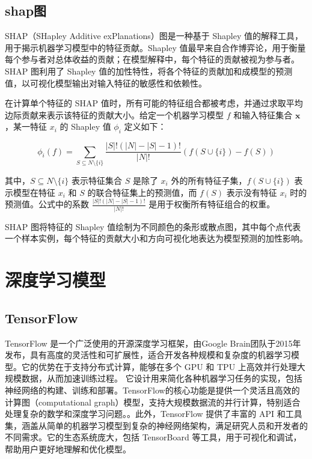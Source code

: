 \documentclass[AutoFakeBold]{LZUThesis-PgD&PhD}
\begin{document}
	\subsection{shap图}
	
	
	
	
	SHAP（SHapley Additive exPlanations）图是一种基于 Shapley 值的解释工具，用于揭示机器学习模型中的特征贡献。Shapley 值最早来自合作博弈论，用于衡量每个参与者对总体收益的贡献；在模型解释中，每个特征的贡献被视为参与者。SHAP 图利用了 Shapley 值的加性特性，将各个特征的贡献加和成模型的预测值，以可视化模型输出对输入特征的敏感性和依赖性。
	
	在计算单个特征的 SHAP 值时，所有可能的特征组合都被考虑，并通过求取平均边际贡献来表示该特征的贡献大小。给定一个机器学习模型 \( f \) 和输入特征集合 \( \mathbf{x} \)，某一特征 \( x_i \) 的 Shapley 值 \( \phi_i \) 定义如下：
	
	\[
	\phi_i(f) = \sum_{S \subseteq N \setminus \{i\}} \frac{|S|! (|N| - |S| - 1)!}{|N|!} \left( f(S \cup \{i\}) - f(S) \right)
	\]
	
	其中，\( S \subseteq N \setminus \{i\} \) 表示特征集合 \( S \) 是除了 \( x_i \) 外的所有特征子集，\( f(S \cup \{i\}) \) 表示模型在特征 \( x_i \) 和 \( S \) 的联合特征集上的预测值，而 \( f(S) \) 表示没有特征 \( x_i \) 时的预测值。公式中的系数 \( \frac{|S|! (|N| - |S| - 1)!}{|N|!} \) 是用于权衡所有特征组合的权重。
	
	SHAP 图将特征的 Shapley 值绘制为不同颜色的条形或散点图，其中每个点代表一个样本实例，每个特征的贡献大小和方向可视化地表达为模型预测的加性影响。
	\section{深度学习模型}
	
	
	\subsection{TensorFlow}
	
	TensorFlow 是一个广泛使用的开源深度学习框架，由Google Brain团队于2015年发布，具有高度的灵活性和可扩展性，适合开发各种规模和复杂度的机器学习模型。它的优势在于支持分布式计算，能够在多个 GPU 和 TPU 上高效并行处理大规模数据，从而加速训练过程。
	它设计用来简化各种机器学习任务的实现，包括神经网络的构建、训练和部署。TensorFlow的核心功能是提供一个灵活且高效的计算图（computational graph）模型，支持大规模数据流的并行计算，特别适合处理复杂的数学和深度学习问题。。此外，TensorFlow 提供了丰富的 API 和工具集，涵盖从简单的机器学习模型到复杂的神经网络架构，满足研究人员和开发者的不同需求。它的生态系统庞大，包括 TensorBoard 等工具，用于可视化和调试，帮助用户更好地理解和优化模型。
	
\end{document}
